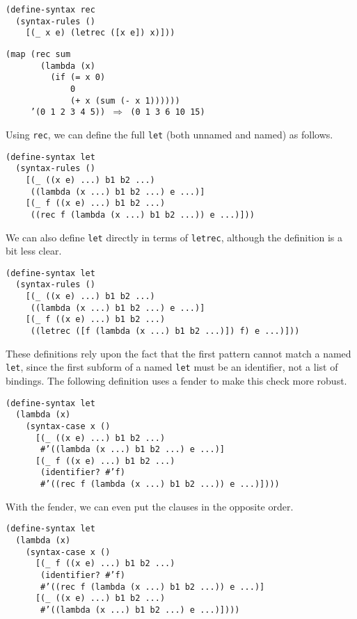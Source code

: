 \begin{alltt}
(define-syntax rec
  (syntax-rules ()
    [(\_{} x e) (letrec ([x e]) x)]))

(map (rec sum
       (lambda (x)
         (if (= x 0)
             0
             (+ x (sum (- x 1))))))
     '(0 1 2 3 4 5)) \(\Rightarrow\) (0 1 3 6 10 15)
\end{alltt}


Using \texttt{rec}, we can define the full \texttt{let} (both
unnamed and named) as follows.


\begin{alltt}
(define-syntax let
  (syntax-rules ()
    [(\_{} ((x e) ...) b1 b2 ...)
     ((lambda (x ...) b1 b2 ...) e ...)]
    [(\_{} f ((x e) ...) b1 b2 ...)
     ((rec f (lambda (x ...) b1 b2 ...)) e ...)]))
\end{alltt}


We can also define \texttt{let} directly in terms of
\texttt{letrec}, although the definition is a bit less clear.


\begin{alltt}
(define-syntax let\label{syntax_defn_let}
  (syntax-rules ()
    [(\_{} ((x e) ...) b1 b2 ...)
     ((lambda (x ...) b1 b2 ...) e ...)]
    [(\_{} f ((x e) ...) b1 b2 ...)
     ((letrec ([f (lambda (x ...) b1 b2 ...)]) f) e ...)]))
\end{alltt}


These definitions rely upon the fact that the first pattern cannot
match a named \texttt{let}, since the first subform of a named
\texttt{let} must
be an identifier, not a list of bindings.
The following definition uses a fender to make this check more
robust.


\begin{alltt}
(define-syntax let
  (lambda (x)
    (syntax-case x ()
      [(\_{} ((x e) ...) b1 b2 ...)
       \#{}'((lambda (x ...) b1 b2 ...) e ...)]
      [(\_{} f ((x e) ...) b1 b2 ...)
       (identifier? \#{}'f)
       \#{}'((rec f (lambda (x ...) b1 b2 ...)) e ...)])))
\end{alltt}


With the fender, we can even put the clauses in the opposite order.


\begin{alltt}
(define-syntax let
  (lambda (x)
    (syntax-case x ()
      [(\_{} f ((x e) ...) b1 b2 ...)
       (identifier? \#{}'f)
       \#{}'((rec f (lambda (x ...) b1 b2 ...)) e ...)]
      [(\_{} ((x e) ...) b1 b2 ...)
       \#{}'((lambda (x ...) b1 b2 ...) e ...)])))
\end{alltt}


